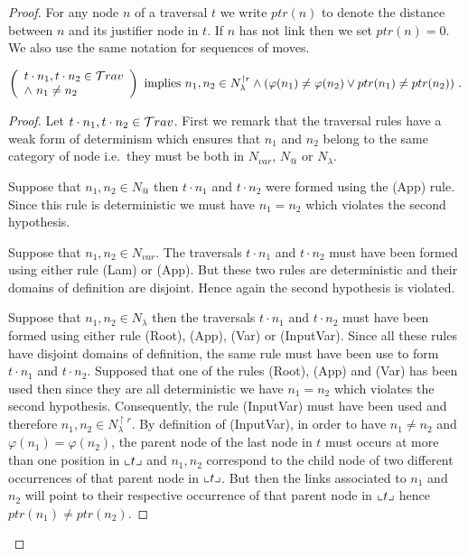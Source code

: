 \begin{proof}
For any node $n$ of a traversal $t$ we write $ptr(n)$ to denote the distance between $n$ and its justifier node in $t$. If $n$ has not link then we set $ptr(n)=0$. We also use the same notation for sequences of moves.

\begin{lem}
\label{lem:varphiinjective:prelem}
\begin{equation}
\left(
  \begin{array}{ll}
    t \cdot n_1, t \cdot n_2 \in \travset \\
    \zand\ n_1 \neq n_2
  \end{array}
\right)
 \mbox{ implies } n_1,n_2 \in N^{\upharpoonright r}_{\lambda} \zand ( \varphi(n_1) \neq \varphi(n_2) \zor ptr(n_1) \neq ptr(n_2) ) \ . \end{equation}
\end{lem}
\begin{proof}
Let $t \cdot n_1, t \cdot n_2 \in \mathcal{T}rav$.
First we remark that the traversal rules have a weak form of determinism which ensures that $n_1$ and $n_2$ belong to the same category of node i.e.\ they must be both in $N_{var}$, $N_@$ or $N_\lambda$.

Suppose that $n_1, n_2 \in N_@$ then $t \cdot n_1$ and $t \cdot n_2$ were formed using the (App) rule. Since this rule is deterministic we must have $n_1=n_2$ which violates the second hypothesis.


Suppose that $n_1,n_2\in N_{var}$. The traversals $t \cdot n_1$ and $t \cdot n_2$ must have been formed using either rule (Lam) or (App). But these two rules are deterministic and their domains of definition are disjoint. Hence again the second hypothesis is violated.

Suppose that $n_1,n_2\in N_\lambda$ then
the traversals $t \cdot n_1$ and $t \cdot n_2$ must have been formed using either rule (Root), (App), (Var) or (InputVar). Since all these rules have disjoint domains of definition, the same rule must have been use to form $t \cdot n_1$ and $t \cdot n_2$. Supposed that one of the rules (Root), (App) and (Var) has been used then since they are all deterministic we have $n_1=n_2$ which violates the second hypothesis. Consequently, the rule (InputVar) must have been used and therefore $n_1,n_2 \in N_\lambda^{\upharpoonright r}$. By definition of (InputVar), in order to have $n_1\neq n_2$ and $\varphi(n_1) = \varphi(n_2)$, the parent node of the last node in $t$ must occurs at more than one position in $\llcorner t \lrcorner$ and $n_1,n_2$ correspond to the child node of two different occurrences of that parent node in $\llcorner t \lrcorner$. But then the links associated to $n_1$ and $n_2$ will point to their respective occurrence of that parent node in $\llcorner t \lrcorner$ hence $ptr(n_1) \neq ptr(n_2)$.
\end{proof}


\end{proof}
